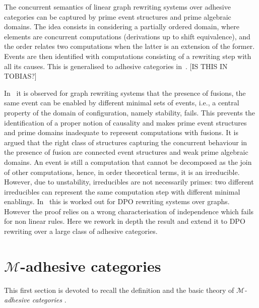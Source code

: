 \documentclass[a4paper]{article}
\theoremstyle{definition}
\begin{document}
The concurrent semantics of linear graph rewriting systems over
adhesive categories can be captured by prime event structures and
prime algebraic domains. The idea consists in considering a partially
ordered domain, where elements are concurrent computations
(derivations up to shift equivalence), and the order relates two
computations when the latter is an extension of the former.
%
Events are then identified with computations consisting of a rewriting
step with all its causes. This is generalised to adhesive categories
in~\cite{heindel2009category}. [IS THIS IN TOBIAS?]

In~\cite{baldan2017domains} it is observed for graph rewriting systems that the presence of fusions, the same event can be enabled by different minimal sets of events, i.e., a central property of the domain of configuration, namely stability, fails. This prevents the identification of a proper notion of causality and makes prime event structures and prime domains inadequate to represent computations with fusions. It is argued that the right class of structures capturing the concurrent behaviour in the presence of fusion are connected event structures and weak prime algebraic domains.
%
An event is still a computation that cannot be decomposed
as the join of other computations, hence, in order theoretical terms,
it is an irreducible.
%
However, due to unstability, irreducibles are not necessarily primes:
two different irreducibles can represent the same computation step
with different minimal enablings.  In~\cite{baldan2017domains} this
is worked out for DPO rewriting systems over graphs. However the proof
relies on a wrong characterisation of independence which fails for non
linear rules. Here we rework in depth the result and extend it to DPO
rewriting over a large class of adhesive categories.

\section{$\mathcal{M}$-adhesive categories}

This first section is devoted to recall the definition and the basic theory of \emph{$\mathcal{M}$-adhesive categories} \cite{azzi2019essence,ehrig2012,ehrig2014adhesive,lack2005adhesive}. 
\end{document}
